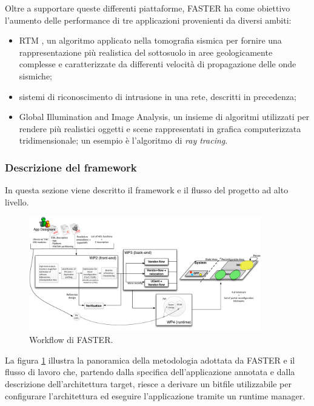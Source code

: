 Oltre a supportare queste differenti piattaforme, \ac{FASTER} ha come obiettivo 
l'aumento delle performance di tre applicazioni provenienti da diversi ambiti:
\begin{itemize}
 \item \acf{RTM} \cite{RTMArticle}, un algoritmo applicato nella tomografia sismica per 
fornire una rappresentazione più realistica del sottosuolo in aree 
geologicamente complesse e caratterizzate da differenti velocità di 
propagazione delle onde sismiche;
 \item sistemi di riconoscimento di intrusione in una rete, descritti in 
precedenza;
 \item Global Illumination and Image Analysis, un insieme di algoritmi 
utilizzati per rendere più realistici oggetti e scene rappresentati in grafica 
computerizzata tridimensionale; un esempio è l'algoritmo di \emph{ray tracing}.
\end{itemize}

\subsubsection{Descrizione del framework}
In questa sezione viene descritto il framework e il flusso del progetto ad  
alto livello.

\begin{figure}
 \begin{center}  
\includegraphics[width=0.9\textwidth]
{capitoli/figure/cap2/FASTERWorkflow.pdf}
\caption{Workflow di \ac{FASTER}.}
\label{fig:FASTERWorkflow}
 \end{center}
\end{figure}

La figura \ref{fig:FASTERWorkflow} illustra la panoramica della metodologia 
adottata da \ac{FASTER} e il flusso di lavoro che, partendo dalla specifica 
dell'applicazione annotata e dalla descrizione dell'architettura target, riesce 
a derivare un bitfile utilizzabile per configurare l'architettura ed eseguire 
l'applicazione tramite un runtime manager.

